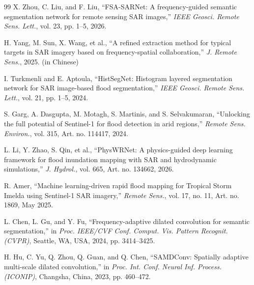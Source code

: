 \documentclass[lettersize,journal]{IEEEtran}
\begin{document}
\begin{thebibliography}{99}
X. Zhou, C. Liu, and F. Liu, ``FSA-SARNet: A frequency-guided semantic segmentation network for remote sensing SAR images,'' \textit{IEEE Geosci. Remote Sens. Lett.}, vol. 23, pp. 1--5, 2026.

H. Yang, M. Sun, X. Wang, et al., ``A refined extraction method for typical targets in SAR imagery based on frequency-spatial collaboration,'' \textit{J. Remote Sens.}, 2025. (in Chinese)

I. Turkmenli and E. Aptoula, ``HistSegNet: Histogram layered segmentation network for SAR image-based flood segmentation,'' \textit{IEEE Geosci. Remote Sens. Lett.}, vol. 21, pp. 1--5, 2024.

S. Garg, A. Dasgupta, M. Motagh, S. Martinis, and S. Selvakumaran, ``Unlocking the full potential of Sentinel-1 for flood detection in arid regions,'' \textit{Remote Sens. Environ.}, vol. 315, Art. no. 114417, 2024.

L. Li, Y. Zhao, S. Qin, et al., ``PhysWRNet: A physics-guided deep learning framework for flood inundation mapping with SAR and hydrodynamic simulations,'' \textit{J. Hydrol.}, vol. 665, Art. no. 134662, 2026.

R. Amer, ``Machine learning-driven rapid flood mapping for Tropical Storm Imelda using Sentinel-1 SAR imagery,'' \textit{Remote Sens.}, vol. 17, no. 11, Art. no. 1869, May 2025.

L. Chen, L. Gu, and Y. Fu, ``Frequency-adaptive dilated convolution for semantic segmentation,'' in \textit{Proc. IEEE/CVF Conf. Comput. Vis. Pattern Recognit. (CVPR)}, Seattle, WA, USA, 2024, pp. 3414--3425.

H. Hu, C. Yu, Q. Zhou, Q. Guan, and Q. Chen, ``SAMDConv: Spatially adaptive multi-scale dilated convolution,'' in \textit{Proc. Int. Conf. Neural Inf. Process. (ICONIP)}, Changsha, China, 2023, pp. 460--472.

\end{thebibliography}
\end{document}
